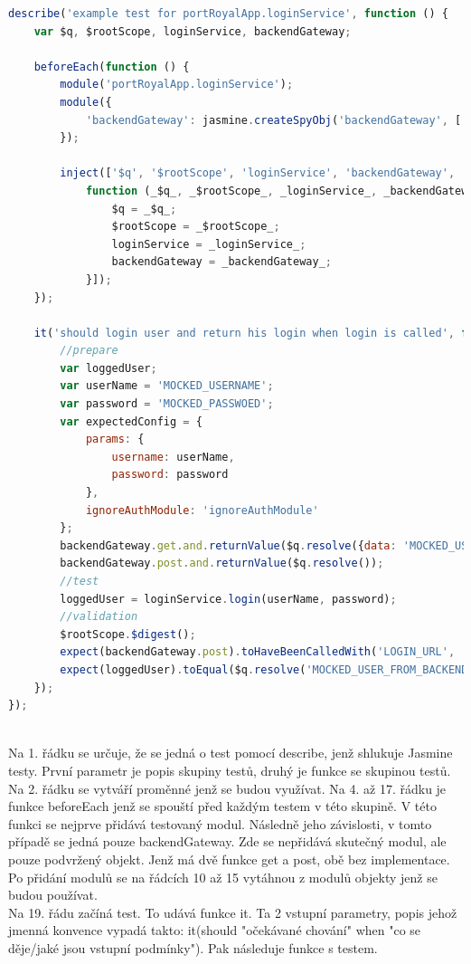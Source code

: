 \documentclass[czech,master,public,dept460,male,cpdeclaration,twoside]{diploma}
\begin{document}
\begin{lstlisting}[language=JavaScript, caption=Ukázka testu pomocí Jasmine]
describe('example test for portRoyalApp.loginService', function () {
    var $q, $rootScope, loginService, backendGateway;

    beforeEach(function () {
        module('portRoyalApp.loginService');
        module({
            'backendGateway': jasmine.createSpyObj('backendGateway', ['get', 'post'])
        });

        inject(['$q', '$rootScope', 'loginService', 'backendGateway',
            function (_$q_, _$rootScope_, _loginService_, _backendGateway_) {
                $q = _$q_;
                $rootScope = _$rootScope_;
                loginService = _loginService_;
                backendGateway = _backendGateway_;
            }]);
    });

    it('should login user and return his login when login is called', function () {
        //prepare
        var loggedUser;
        var userName = 'MOCKED_USERNAME';
        var password = 'MOCKED_PASSWOED';
        var expectedConfig = {
            params: {
                username: userName,
                password: password
            },
            ignoreAuthModule: 'ignoreAuthModule'
        };
        backendGateway.get.and.returnValue($q.resolve({data: 'MOCKED_USER_FROM_BACKEND'}));
        backendGateway.post.and.returnValue($q.resolve());
        //test
        loggedUser = loginService.login(userName, password);
        //validation
        $rootScope.$digest();
        expect(backendGateway.post).toHaveBeenCalledWith('LOGIN_URL', '', expectedConfig, false, true);
        expect(loggedUser).toEqual($q.resolve('MOCKED_USER_FROM_BACKEND'));
    });
});
\end{lstlisting}
~\\
Na 1. řádku se určuje, že se jedná o test pomocí describe, jenž shlukuje Jasmine testy. První parametr je popis skupiny testů, druhý je funkce se skupinou testů.\\
Na 2. řádku se vytváří proměnné jenž se budou využívat.
Na 4. až 17. řádku je funkce beforeEach jenž se spouští před každým testem v této skupině. V této funkci se nejprve přidává testovaný modul. Následně jeho závislosti, v tomto případě se jedná pouze backendGateway. Zde se nepřidává skutečný modul, ale pouze podvržený objekt. Jenž má dvě funkce get a post, obě bez implementace. Po přidání modulů se na řádcích 10 až 15 vytáhnou z modulů objekty jenž se budou používat.\\
Na 19. řádu začíná test. To udává funkce it. Ta 2 vstupní parametry, popis jehož jmenná konvence vypadá takto: it(should "očekávané chování" when "co se děje/jaké jsou vstupní podmínky"). Pak následuje funkce s testem.\\
\end{document}
